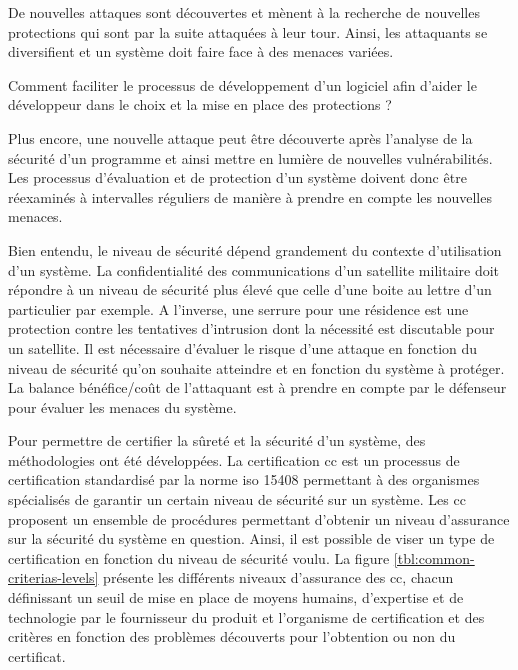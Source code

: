         De nouvelles attaques sont découvertes et mènent à la recherche de nouvelles protections qui sont par la suite attaquées à leur tour. Ainsi, les attaquants se diversifient et un système doit faire face à des menaces variées. 
        
        \begin{probl}
        \label{prob:help-dev}
            Comment faciliter le processus de développement d'un logiciel afin d'aider le développeur dans le choix et la mise en place des protections ?
        \end{probl}
        
        Plus encore, une nouvelle attaque peut être découverte après l'analyse de la sécurité d'un programme et ainsi mettre en lumière de nouvelles vulnérabilités. Les processus d'évaluation et de protection d'un système doivent donc être réexaminés à intervalles réguliers de manière à prendre en compte les nouvelles menaces. 
        
        Bien entendu, le niveau de sécurité dépend grandement du contexte d'utilisation d'un système. La confidentialité des communications d'un satellite militaire doit répondre à un niveau de sécurité plus élevé que celle d'une boite au lettre d'un particulier par exemple. A l'inverse, une serrure pour une résidence est une protection contre les tentatives d'intrusion dont la nécessité est discutable pour un satellite. Il est nécessaire d'évaluer le risque d'une attaque en fonction du niveau de sécurité qu'on souhaite atteindre et en fonction du système à protéger. La balance bénéfice/coût de l'attaquant est à prendre en compte par le défenseur pour évaluer les menaces du système.
        
        Pour permettre de certifier la sûreté et la sécurité d'un système, des méthodologies ont été développées. La certification \gls{cc} \cite{CommonCriteria17} est un processus de certification standardisé par la norme \gls{iso} 15408 permettant à des organismes spécialisés de garantir un certain niveau de sécurité sur un système. Les \gls{cc} proposent un ensemble de procédures permettant d'obtenir un niveau d'assurance sur la sécurité du système en question. Ainsi, il est possible de viser un type de certification en fonction du niveau de sécurité voulu. La figure \ref{tbl:common-criterias-levels} présente les différents niveaux d'assurance des \gls{cc}, chacun définissant un seuil de mise en place de moyens humains, d'expertise et de technologie par le fournisseur du produit et l'organisme de certification et des critères en fonction des problèmes découverts pour l'obtention ou non du certificat. 
        
